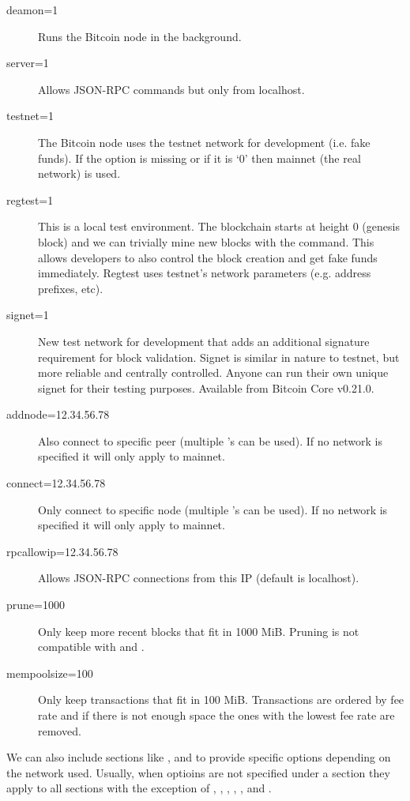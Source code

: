 \begin{description}
	\item[deamon=1] Runs the Bitcoin node in the background.
	\item[server=1] Allows JSON-RPC commands but only from localhost.
	\item[testnet=1] The Bitcoin node uses the testnet network for development (i.e. fake funds). If the option is missing or if it is `0' then mainnet (the real network) is used.
	\item[regtest=1] This is a local test environment. The blockchain starts at height 0 (genesis block) and we can trivially mine new blocks with the  command. This allows developers to also control the block creation and get fake funds immediately. Regtest uses testnet’s network parameters (e.g. address prefixes, etc).
	\item[signet=1] New test network for development that adds an additional signature requirement for block validation. Signet is similar in nature to testnet, but more reliable and centrally controlled. Anyone can run their own unique signet for their testing purposes. Available from Bitcoin Core v0.21.0.
	\item[addnode=12.34.56.78] Also connect to specific peer (multiple 's can be used). If no network is specified it will only apply to mainnet.
	\item[connect=12.34.56.78] Only connect to specific node (multiple 's can be used). If no network is specified it will only apply to mainnet.
	\item[rpcallowip=12.34.56.78] Allows JSON-RPC connections from this IP (default is localhost).
	\item[prune=1000] Only keep more recent blocks that fit in 1000 MiB. Pruning is not compatible with  and . 
	\item[mempoolsize=100] Only keep transactions that fit in 100 MiB. Transactions are ordered by fee rate and if there is not enough space the ones with the lowest fee rate are removed.
\end{description}

We can also include sections like ,  and  to provide specific options depending on the network used. Usually, when optioins are not specified under a section they apply to all sections with the exception of , , , , ,  and .

